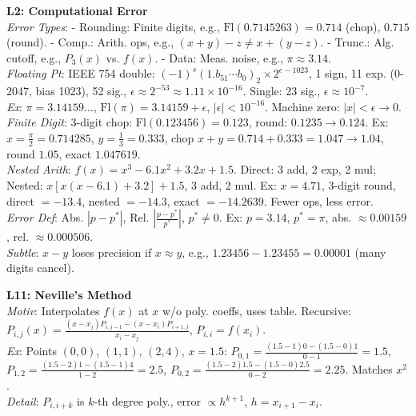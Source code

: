 \documentclass[9pt]{article}
\begin{document}
\begin{multicols}{3}
\textbf{L2: Computational Error} \\
\textit{Error Types}: 
- Rounding: Finite digits, e.g., $\text{Fl}(0.7145263)=0.714$ (chop), $0.715$ (round). 
- Comp.: Arith. ops, e.g., $(x+y)-z \neq x+(y-z)$. 
- Trunc.: Alg. cutoff, e.g., $P_3(x)$ vs. $f(x)$. 
- Data: Meas. noise, e.g., $\pi \approx 3.14$. \\
\textit{Floating Pt}: IEEE 754 double: $(-1)^s (1.b_{51}\cdots b_0)_2 \times 2^{e-1023}$, 1 sign, 11 exp. (0-2047, bias 1023), 52 sig., $\epsilon \approx 2^{-53} \approx 1.11 \times 10^{-16}$. Single: 23 sig., $\epsilon \approx 10^{-7}$. \\
\textit{Ex}: $\pi=3.14159\ldots$, $\text{Fl}(\pi)=3.14159+\epsilon$, $|\epsilon| < 10^{-16}$. Machine zero: $|x| < \epsilon \to 0$. \\
\textit{Finite Digit}: 3-digit chop: $\text{Fl}(0.123456)=0.123$, round: $0.1235 \to 0.124$. Ex: $x=\frac{\pi}{2}=0.714285$, $y=\frac{1}{3}=0.333$, chop $x+y=0.714+0.333=1.047 \to 1.04$, round $1.05$, exact $1.047619$. \\
\textit{Nested Arith}: $f(x)=x^3-6.1x^2+3.2x+1.5$. Direct: 3 add, 2 exp, 2 mul; Nested: $x[x(x-6.1)+3.2]+1.5$, 3 add, 2 mul. Ex: $x=4.71$, 3-digit round, direct $=-13.4$, nested $=-14.3$, exact $=-14.2639$. Fewer ops, less error. \\
\textit{Error Def}: Abs. $|p-p^*|$, Rel. $\left|\frac{p-p^*}{p^*}\right|$, $p^* \neq 0$. Ex: $p=3.14$, $p^*=\pi$, abs. $\approx 0.00159$, rel. $\approx 0.000506$. \\
\textit{Subtle}: $x-y$ loses precision if $x \approx y$, e.g., $1.23456-1.23455=0.00001$ (many digits cancel).

\textbf{L11: Neville’s Method} \\
\textit{Motiv}: Interpolates $f(x)$ at $x$ w/o poly. coeffs, uses table. Recursive: $P_{i,j}(x)=\frac{(x-x_j)P_{i,j-1}-(x-x_i)P_{i+1,j}}{x_i-x_j}$, $P_{i,i}=f(x_i)$. \\
\textit{Ex}: Points $(0,0)$, $(1,1)$, $(2,4)$, $x=1.5$: $P_{0,1}=\frac{(1.5-1)0-(1.5-0)1}{0-1}=1.5$, $P_{1,2}=\frac{(1.5-2)1-(1.5-1)4}{1-2}=2.5$, $P_{0,2}=\frac{(1.5-2)1.5-(1.5-0)2.5}{0-2}=2.25$. Matches $x^2$. \\
\textit{Detail}: $P_{i,i+k}$ is $k$-th degree poly., error $\propto h^{k+1}$, $h=x_{i+1}-x_i$.


\end{multicols}
\end{document}
